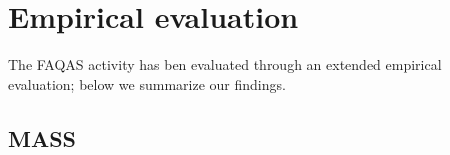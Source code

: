 

\section{Empirical evaluation}
\label{sec:summary:results}

The FAQAS activity has ben evaluated through an extended empirical evaluation; below we summarize our findings. 


\subsection{MASS}

%
%
%
%
%
%
%

